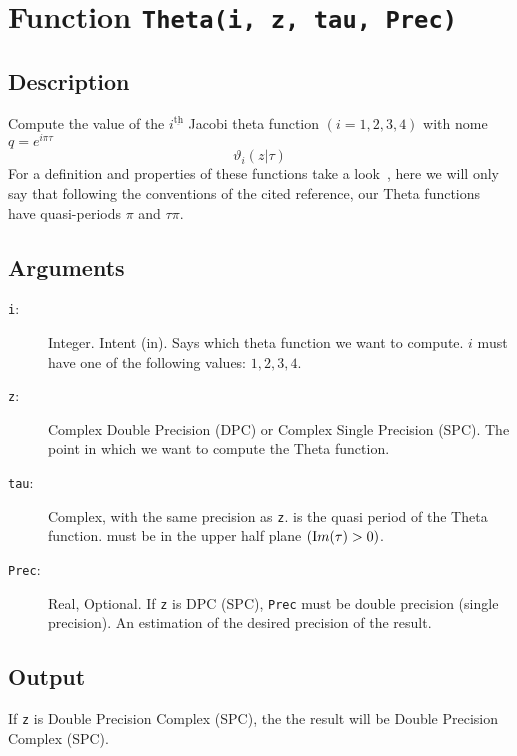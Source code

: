 \section{Function \texttt{Theta(i, z, tau, Prec)}}

\subsection{Description}

Compute the value of the $i^{\underline{\text{th}}}$ Jacobi theta
function $(i=1,2,3,4)$ with nome $q=e^{i\pi\tau}$ 
\begin{equation}
  \vartheta_i(z|\tau)
\end{equation}
For a definition and properties of these functions take a
look~\cite{ww:analysis}, here we will only say that following the
conventions of the cited reference, our Theta functions have
quasi-periods $\pi$ and $\tau\pi$. 

\subsection{Arguments}

\begin{description}
\item[\texttt{i}:] Integer. Intent (in). Says which theta function we
  want to compute. $i$ must have one of the following values: $1,2,3,4$.
\item[\texttt{z}:] Complex Double Precision (DPC) or Complex Single
  Precision (SPC). The point in which we want to compute the Theta
  function.
\item[\texttt{tau}:] Complex, with the same precision as
  \texttt{z}. is the quasi period of the Theta function. must be in
  the upper half plane $(\textrm Im(\tau)> 0)$.
\item[\texttt{Prec}:] Real, Optional. If \texttt{z} is DPC (SPC),
  \texttt{Prec} must be double precision (single precision). An
  estimation of the desired precision of the result.
\end{description}

\subsection{Output}

If \texttt{z} is Double Precision Complex (SPC), the the result will be
Double Precision Complex (SPC).


